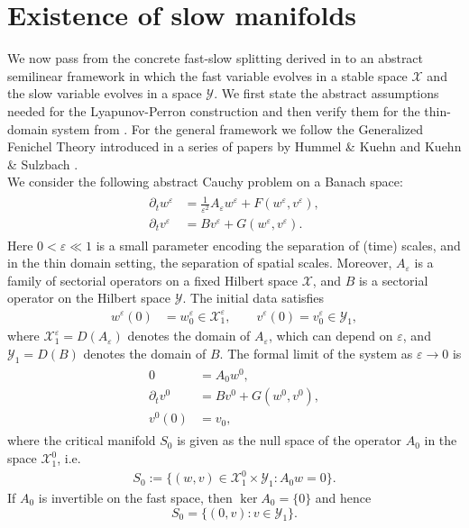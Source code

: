 \documentclass[11pt]{article}
\theoremstyle{definition}
\theoremstyle{remark}
\numberwithin{equation}{section}
\newcommand{\eps}{\varepsilon}
\newcommand{\mc}[1]{\mathcal{#1}}
\begin{document}
\section{Existence of slow manifolds}\label{sec:manifolds}

We now pass from the concrete fast-slow splitting derived in  to an abstract semilinear framework in which the fast variable evolves in a stable space \(\mc X\) and the slow variable evolves in a space \(\mc Y\). 
We first state the abstract assumptions needed for the Lyapunov-Perron construction and then verify them for the thin-domain system from . 
For the general framework we follow the Generalized Fenichel Theory introduced in a series of papers  by Hummel \& Kuehn \cite{hummel2022slow} and Kuehn \& Sulzbach \cite{kuehn2024infinite,kuehn2025fast,kuehn2026approximate}.\\

We consider the following abstract Cauchy problem on a Banach space:
\begin{align}\label{eq: fast diffusion}
    \begin{split}
        \partial_t w^\varepsilon &= \frac{1}{\varepsilon^2} A_\varepsilon w^\varepsilon + F(w^\varepsilon, v^\varepsilon),\\
        \partial_t v^\varepsilon&= B v^\varepsilon + G(w^\varepsilon, v^\varepsilon).
    \end{split}
\end{align}
Here $0< \varepsilon\ll 1$ is a small parameter encoding the separation of  (time) scales, and in the thin domain setting, the separation of spatial scales.
Moreover, \(A_\varepsilon\) is a family of sectorial operators on a fixed Hilbert space \(\mc X\), and  $B$ is a sectorial operator on the Hilbert space \(\mc Y\).
The initial data satisfies
\begin{align}
    w^\varepsilon(0)&=  w^\varepsilon_0 \in \mc X_1^\eps,\qquad  v^\varepsilon(0)=  v^\varepsilon_0\in \mc Y_1,
\end{align}
where $\mc X_1^\eps=D(A_\eps)$ denotes the domain of $A_\eps$, which can depend on $\eps$, and $\mc Y_1=D(B)$ denotes the domain of $B$.
The formal limit of the system as $\varepsilon\to 0$ is
\begin{align}\label{eq: fast diffuion limit}
   \begin{split}
       0&= A_0 w^0,\\
       \partial_t v^0&= B v^0+ G(w^0,v^0),\\
       v^0(0)&=v_0,
   \end{split}
\end{align} 
where the critical manifold $S_0$ is given as the null space of the operator $A_0$ in the space $\mc X_{1}^0$, i.e.
\begin{align}\label{eq: critical manifold}
    S_0 := \{(w,v)\in \mc X_1^0\times \mc Y_1 : A_0 w = 0\}.
\end{align}
If \(A_0\) is invertible on the fast space, then \(\ker A_0=\{0\}\) and hence
\[
 S_0 = \{(0,v): v\in \mc Y_1\}.
\]
\end{document}
